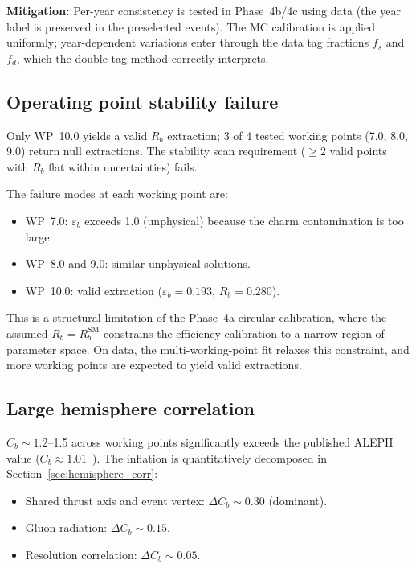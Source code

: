 \documentclass[11pt,a4paper]{article}
\begin{document}
\textbf{Mitigation:} Per-year consistency is tested in Phase~4b/4c using data (the
year label is preserved in the preselected events). The MC calibration is applied
uniformly; year-dependent variations enter through the data tag fractions $f_s$ and
$f_d$, which the double-tag method correctly interprets.

\subsection{Operating point stability failure}

Only WP~10.0 yields a valid $R_b$ extraction; 3 of 4 tested working points
(7.0, 8.0, 9.0) return null extractions. The stability scan requirement
($\geq 2$ valid points with $R_b$ flat within uncertainties) fails.

The failure modes at each working point are:
\begin{itemize}
\item WP~7.0: $\varepsilon_b$ exceeds 1.0 (unphysical) because the charm
contamination is too large.
\item WP~8.0 and 9.0: similar unphysical solutions.
\item WP~10.0: valid extraction ($\varepsilon_b = 0.193$, $R_b = 0.280$).
\end{itemize}

This is a structural limitation of the Phase~4a circular calibration, where the
assumed $R_b = R_b^\mathrm{SM}$ constrains the efficiency calibration to a narrow
region of parameter space. On data, the multi-working-point fit relaxes this
constraint, and more working points are expected to yield valid extractions.

\subsection{Large hemisphere correlation}

$C_b \sim 1.2$--1.5 across working points significantly exceeds the published ALEPH
value ($C_b \approx 1.01$~\cite{ALEPH:Rb:1996}). The inflation is quantitatively
decomposed in Section~\ref{sec:hemisphere_corr}:
\begin{itemize}
\item Shared thrust axis and event vertex: $\Delta C_b \sim 0.30$ (dominant).
\item Gluon radiation: $\Delta C_b \sim 0.15$.
\item Resolution correlation: $\Delta C_b \sim 0.05$.
\end{itemize}
\end{document}
